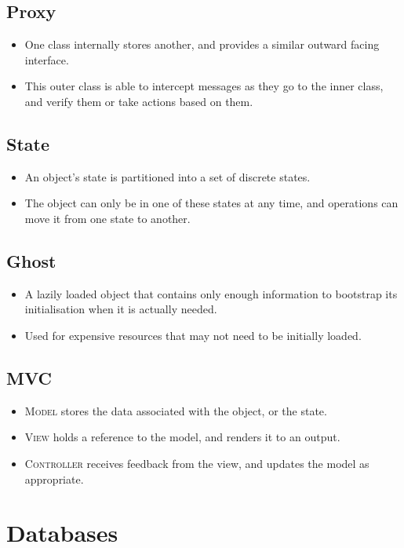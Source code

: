 \documentclass[landscape]{cheat}
\begin{document}
\begin{multicols*}{3}
\subsection{Proxy}
\begin{itemize}
    \item One class internally stores another, and provides a similar outward facing interface.
    \item This outer class is able to intercept messages as they go to the inner class, and verify them or take actions based on them.
\end{itemize}

\subsection{State}
\begin{itemize}
    \item An object's state is partitioned into a set of discrete states.
    \item The object can only be in one of these states at any time, and operations can move it from one state to another.
\end{itemize}

\subsection{Ghost}
\begin{itemize}
    \item A lazily loaded object that contains only enough information to bootstrap its initialisation when it is actually needed.
    \item Used for expensive resources that may not need to be initially loaded.
\end{itemize}

\subsection{MVC}
\begin{itemize}
    \item \textsc{Model} stores the data associated with the object, or the state.
    \item \textsc{View} holds a reference to the model, and renders it to an output.
    \item \textsc{Controller} receives feedback from the view, and updates the model as appropriate.
\end{itemize}

\section{Databases}


\end{multicols*}
\end{document}
